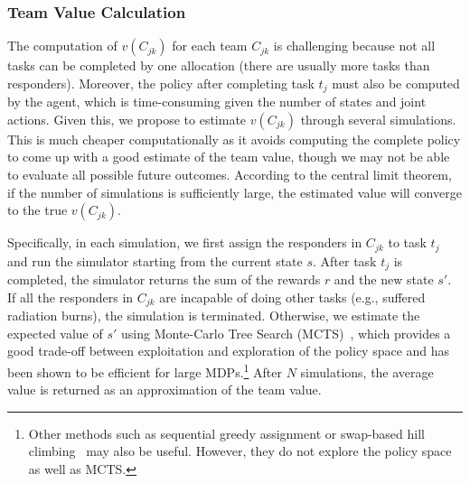 \subsubsection{Team Value Calculation}

The computation of  $v(C_{jk})$ for each team $C_{jk}$ is
challenging because not all tasks can be completed by one
allocation (there are usually more tasks than responders).
Moreover, the policy after completing task $t_j$ must also be
computed by the agent, which is time-consuming given the number of
states and joint actions. Given this, we propose to estimate
$v(C_{jk})$ through several simulations. This is much cheaper
computationally as it avoids computing the complete policy to come
up with a good estimate of the team value, though we may not be
able to evaluate all possible future outcomes. According to the
central limit theorem, if the number of simulations is sufficiently
large, the estimated value will converge to the true $v(C_{jk})$.

Specifically, in each simulation, we first assign the responders in
$C_{jk}$ to task $t_j$ and run the simulator starting from the
current state $s$. After task $t_j$ is completed, the simulator
returns the sum of the rewards $r$ and the new state $s'$. If all
the responders in $C_{jk}$ are incapable of doing other tasks
(e.g., suffered radiation burns), the simulation is terminated.
Otherwise, we estimate the expected value of $s'$ using Monte-Carlo
Tree Search (MCTS)~\cite{kocsis2006bandit}, which provides a good
trade-off between exploitation and exploration of the policy space
and has been shown to be efficient for large MDPs.\footnote{Other
methods such as sequential greedy assignment or swap-based hill
climbing~\cite{proper2009solving} may also be useful. However, they
do not explore the policy space as well as MCTS.} After $N$
simulations, the average value is returned as an approximation of
the team value.

